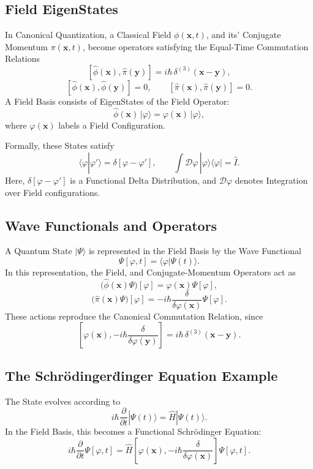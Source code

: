 \documentclass[a4paper, 10pt, onepage]{elegantbook}
\begin{document}
{\subsection{Field EigenStates}

In Canonical Quantization, a Classical Field \(\phi(\mathbf{x},t)\), and its' Conjugate Momentum \(\pi(\mathbf{x},t)\), 
become operators satisfying the Equal-Time Commutation Relations
\[
[\hat{\phi}(\mathbf{x}),\hat{\pi}(\mathbf{y})]
=i\hbar\,\delta^{(3)}(\mathbf{x}-\mathbf{y}),
\]
\[
[\hat{\phi}(\mathbf{x}),\hat{\phi}(\mathbf{y})]=0,
\qquad
[\hat{\pi}(\mathbf{x}),\hat{\pi}(\mathbf{y})]=0.
\]
A Field Basis consists of EigenStates of the Field Operator:
\[
\hat{\phi}(\mathbf{x})\,|\varphi\rangle
=\varphi(\mathbf{x})\,|\varphi\rangle,
\]
where \(\varphi(\mathbf{x})\) labels a Field Configuration.

Formally, these States satisfy
\[
\langle\varphi|\varphi'\rangle
=\delta[\varphi-\varphi'],
\qquad
\int\mathcal{D}\varphi\,
|\varphi\rangle\langle\varphi|=\hat{I}.
\]
Here, \(\delta[\varphi-\varphi']\) is a Functional Delta Distribution, and \(\mathcal{D}\varphi\) denotes Integration 
over Field configurations.

\subsection{Wave Functionals and Operators}

A Quantum State \(|\Psi\rangle\) is represented in the Field Basis by
the Wave Functional
\[
\Psi[\varphi,t]=\langle\varphi|\Psi(t)\rangle.
\]
In this representation, the Field, and Conjugate-Momentum Operators act as
\[
\bigl(\hat{\phi}(\mathbf{x})\Psi\bigr)[\varphi]
=\varphi(\mathbf{x})\Psi[\varphi],
\]
\[
\bigl(\hat{\pi}(\mathbf{x})\Psi\bigr)[\varphi]
=-i\hbar\frac{\delta}{\delta\varphi(\mathbf{x})}
\Psi[\varphi].
\]
These actions reproduce the Canonical Commutation Relation, since
\[
\left[
\varphi(\mathbf{x}),
-i\hbar\frac{\delta}{\delta\varphi(\mathbf{y})}
\right]
=i\hbar\,\delta^{(3)}(\mathbf{x}-\mathbf{y}).
\]

\subsection{The Schr\"odinger\"dinger Equation Example}

The State evolves according to
\[
i\hbar\frac{\partial}{\partial t}|\Psi(t)\rangle
=\hat{H}|\Psi(t)\rangle.
\]
In the Field Basis, this becomes a Functional Schr\"odinger Equation:
\[
i\hbar\frac{\partial}{\partial t}\Psi[\varphi,t]
=
\hat{H}\left[
\varphi(\mathbf{x}),
-i\hbar\frac{\delta}{\delta\varphi(\mathbf{x})}
\right]\Psi[\varphi,t].
\]

}
\end{document}
